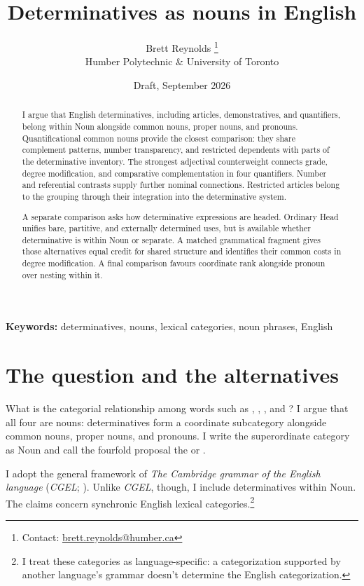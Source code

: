 \documentclass[12pt]{article}
\title{Determinatives as nouns in English}
\author{Brett Reynolds \orcidlink{0000-0003-0073-7195}%
\thanks{Contact: \href{mailto:brett.reynolds@humber.ca}{brett.reynolds@humber.ca}}\\
Humber Polytechnic \& University of Toronto}
\date{Draft, September 2026}
\begin{document}
\maketitle

\begin{abstract}
I argue that English determinatives, including articles, demonstratives, and quantifiers, belong within Noun alongside common nouns, proper nouns, and pronouns. Quantificational common nouns provide the closest comparison: they share complement patterns, number transparency, and restricted dependents with parts of the determinative inventory. The strongest adjectival counterweight connects grade, degree modification, and comparative complementation in four quantifiers. Number and referential contrasts supply further nominal connections. Restricted articles belong to the grouping through their integration into the determinative system.

A separate comparison asks how determinative expressions are headed. Ordinary Head unifies bare, partitive, and externally determined uses, but is available whether determinative is within Noun or separate. A matched grammatical fragment gives those alternatives equal credit for shared structure and identifies their common costs in degree modification. A final comparison favours coordinate rank alongside pronoun over nesting within it.
\end{abstract}

\noindent\textbf{Keywords:} determinatives, nouns, lexical categories, noun phrases, English

\section{The question and the alternatives}\label{sec:intro}

What is the categorial relationship among words such as , , , and ? I argue that all four are nouns: determinatives form a coordinate subcategory alongside common nouns, proper nouns, and pronouns. I write the superordinate category as Noun and call the fourfold proposal the  or .

I adopt the general framework of \textit{The Cambridge grammar of the English language} (\textit{CGEL}; \citealt{huddleston2002}). Unlike \textit{CGEL}, though, I include determinatives within Noun. The claims concern synchronic English lexical categories.\footnote{I treat these categories as language-specific: a categorization supported by another language's grammar doesn't determine the English categorization.}
\end{document}
